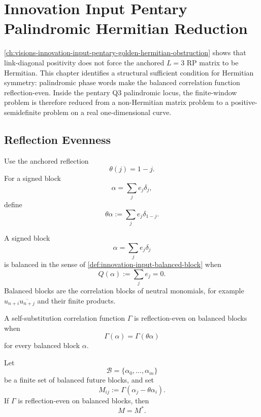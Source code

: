 \chapter{Innovation Input Pentary Palindromic Hermitian Reduction}
\label{ch:visions-innovation-input-pentary-palindromic-hermitian-reduction}

\autoref{ch:visions-innovation-input-pentary-golden-hermitian-obstruction}
shows that link-diagonal positivity does not force the anchored
$L=3$ RP matrix to be Hermitian. This chapter identifies a structural
sufficient condition for Hermitian symmetry: palindromic phase words make
the balanced correlation function reflection-even. Inside the pentary Q3
palindromic locus, the finite-window problem is therefore reduced from a
non-Hermitian matrix problem to a positive-semidefinite problem on a real
one-dimensional curve.

\section{Reflection Evenness}
\label{sec:innovation-input-reflection-evenness}

\begin{definition}
\label{def:innovation-input-block-reflection}
Use the anchored reflection
$$
\theta(j)=1-j.
$$
For a signed block
$$
\alpha=\sum_j e_j\delta_j,
$$
define
$$
\theta\alpha:=\sum_j e_j\delta_{1-j}.
$$
\end{definition}

\begin{definition}
\label{def:innovation-input-balanced-neutral-block}
A signed block
$$
\alpha=\sum_j e_j\delta_j
$$
is balanced in the sense of
\autoref{def:innovation-input-balanced-block} when
$$
Q(\alpha):=\sum_j e_j=0.
$$
Balanced blocks are the correlation blocks of neutral monomials, for
example $u_{n+i}\overline{u_{n+j}}$ and their finite products.
\end{definition}

\begin{definition}
\label{def:innovation-input-reflection-even-balanced-correlations}
A self-substitution correlation function $\Gamma$ is reflection-even on
balanced blocks when
$$
\Gamma(\alpha)=\Gamma(\theta\alpha)
$$
for every balanced block $\alpha$.
\end{definition}

\begin{theorem}
\label{thm:innovation-input-reflection-even-implies-hermitian-rp}
Let
$$
\mathcal B=\{\alpha_0,\ldots,\alpha_m\}
$$
be a finite set of balanced future blocks, and set
$$
M_{ij}:=\Gamma(\alpha_j-\theta\alpha_i).
$$
If $\Gamma$ is reflection-even on balanced blocks, then
$$
M=M^*.
$$
\end{theorem}

